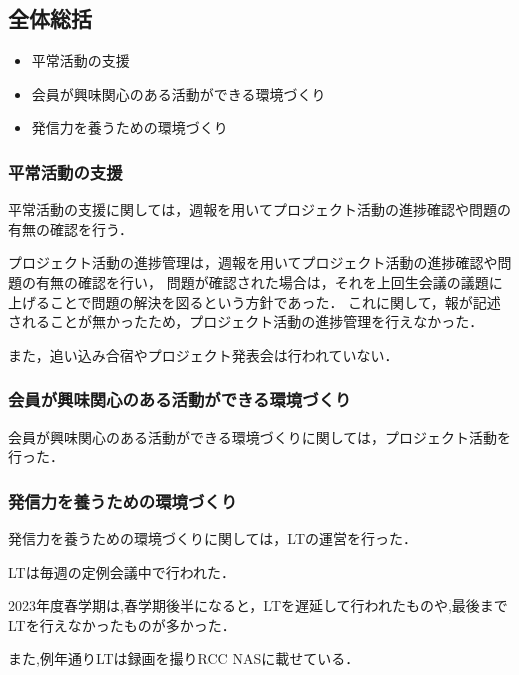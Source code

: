 \subsection*{全体総括}


\begin{itemize}
    \item 平常活動の支援
    \item 会員が興味関心のある活動ができる環境づくり
    \item 発信力を養うための環境づくり
  \end{itemize}
  
  \subsubsection*{平常活動の支援}
  平常活動の支援に関しては，週報を用いてプロジェクト活動の進捗確認や問題の有無の確認を行う．
  
  プロジェクト活動の進捗管理は，週報を用いてプロジェクト活動の進捗確認や問題の有無の確認を行い，
  問題が確認された場合は，それを上回生会議の議題に上げることで問題の解決を図るという方針であった．
  これに関して，報が記述されることが無かったため，プロジェクト活動の進捗管理を行えなかった．
  
  また，追い込み合宿やプロジェクト発表会は行われていない．
  
  \subsubsection*{会員が興味関心のある活動ができる環境づくり}
  会員が興味関心のある活動ができる環境づくりに関しては，プロジェクト活動を行った．
  
  \subsubsection*{発信力を養うための環境づくり}
  発信力を養うための環境づくりに関しては，LTの運営を行った．
  
  LTは毎週の定例会議中で行われた．
  
  2023年度春学期は,春学期後半になると，LTを遅延して行われたものや,最後までLTを行えなかったものが多かった．
  
  また,例年通りLTは録画を撮りRCC NASに載せている．